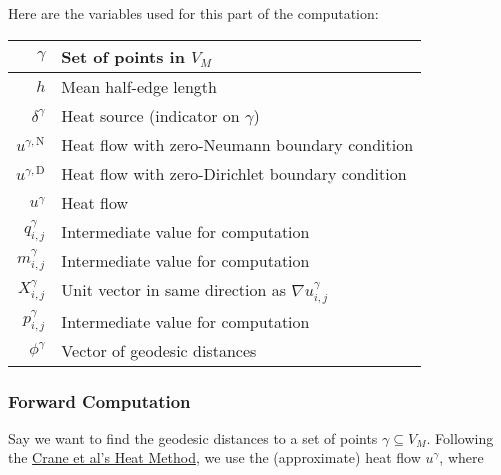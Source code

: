 Here are the variables used for this part of the computation: \begin{center}\begin{tabular}{r|l}
	\(\gamma\) & Set of points in \(V_M\) \\ \hline
	\(h\) & Mean half-edge length \\ \hline
	\(\delta^\gamma\) & Heat source (indicator on \(\gamma\)) \\ \hline
	\(u^{\gamma, \text{N}}\) & Heat flow with zero-Neumann boundary condition \\ \hline
	\(u^{\gamma, \text{D}}\) & Heat flow with zero-Dirichlet boundary condition \\ \hline
	\(u^\gamma\) & Heat flow \\ \hline
	\(q^\gamma_{i, j}\) & Intermediate value for computation \\ \hline
	\(m^\gamma_{i, j}\) & Intermediate value for computation \\ \hline
	\(X^\gamma_{i, j}\) & Unit vector in same direction as \(\nabla u^\gamma_{i, j}\) \\ \hline
	\(p^\gamma_{i, j}\) & Intermediate value for computation \\ \hline
	\(\phi^\gamma\) & Vector of geodesic distances
\end{tabular}\end{center}

\subsubsection{Forward Computation}

Say we want to find the geodesic distances to a set of points \(\gamma \subseteq V_M\). Following the \href{https://www.cs.cmu.edu/~kmcrane/Projects/HeatMethod/}{Crane et al's Heat Method}, we use the (approximate) heat flow \(u^\gamma\), where

